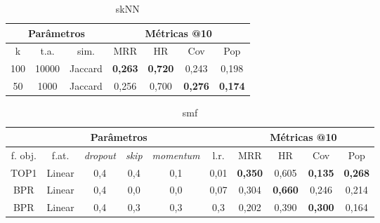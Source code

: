 \begin{table}[htbp]
  \centering
  \begin{tabular}{|c|c|c|c|c|c|c|}
    \hline
      \multicolumn{3}{|c|}{Parâmetros} & \multicolumn{4}{c|}{Métricas @10} \\
      \hline
      k & t.a. & sim. & MRR & HR & Cov & Pop \\
      \hline
      100 & 10000 & Jaccard & \textbf{0,263} & \textbf{0,720} & 0,243 & 0,198 \\
      \hline
      50 & 1000 & Jaccard & 0,256 & 0,700 & \textbf{0,276} & \textbf{0,174} \\
      \hline
\end{tabular}
      \caption{skNN}
      \label{opt:skNN_last}
\end{table}

\begin{table}[htbp]
  \centering
  \begin{tabular}{|c|c|c|c|c|c|c|c|c|c|}
    \hline
      \multicolumn{6}{|c|}{Parâmetros} & \multicolumn{4}{c|}{Métricas @10} \\
      \hline
      f. obj. & f.at. & \textit{dropout} & \textit{skip} & \textit{momentum} & l.r. & MRR & HR & Cov & Pop \\
      \hline
      TOP1 & Linear & 0,4 & 0,4 & 0,1 & 0,01 & \textbf{0,350} & 0,605 & \textbf{0,135} & \textbf{0,268} \\
      \hline
      BPR & Linear & 0,4 & 0,0 & 0,0 & 0,07 & 0,304 & \textbf{0,660} & 0,246 & 0,214 \\
      \hline
      BPR & Linear & 0,4 & 0,3 & 0,3 & 0,3 & 0,202 & 0,390 & \textbf{0,300} & 0,164 \\
      \hline
\end{tabular}
      \caption{smf}
      \label{opt:smf_last}
\end{table}

